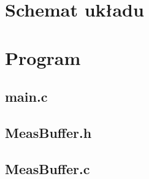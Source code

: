 \documentclass[fleqn]{article}
\begin{document}
\section{Schemat układu}

\pagebreak

\section{Program}
\subsection{main.c}

\begin{minipage}[t]{.49\textwidth}
	
\end{minipage}\hfill
\noindent\begin{minipage}[t]{.49\textwidth}
	
\end{minipage}\hfill

\begin{minipage}[t]{.49\textwidth}
	
\end{minipage}\hfill
\noindent\begin{minipage}[t]{.49\textwidth}
	\subsection{MeasBuffer.h}
	
	\subsection{MeasBuffer.c}
	
\end{minipage}\hfill
\end{document}
